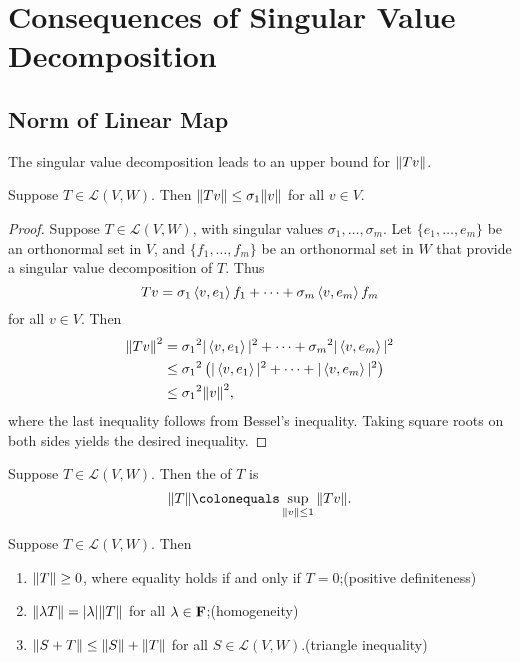 \section{Consequences of Singular Value Decomposition}
\subsection{Norm of Linear Map}
The singular value decomposition leads to an upper bound for $\norm{Tv}$.

\begin{lemma}\label{lemma:norm-upper-bound}
Suppose $T\in\mathcal{L}(V,W)$. Then $\norm{Tv}\le\sigma_1\norm{v}$ for all $v\in V$.
\end{lemma}

\begin{proof}
Suppose $T\in\mathcal{L}(V,W)$, with singular values $\sigma_1,\dots,\sigma_m$. 
Let $\{e_1,\dots,e_m\}$ be an orthonormal set in $V$, and $\{f_1,\dots,f_m\}$ be an orthonormal set in $W$ that provide a singular value decomposition of $T$. 
Thus
\[Tv=\sigma_1\left\langle v,e_1\right\rangle f_1+\cdots+\sigma_m\left\langle v,e_m\right\rangle f_m\]
for all $v\in V$. Then
\begin{align*}
\norm{Tv}^2&={\sigma_1}^2|\left\langle v,e_1\right\rangle|^2+\cdots+{\sigma_m}^2|\left\langle v,e_m\right\rangle|^2\\
&\le{\sigma_1}^2\left(|\left\langle v,e_1\right\rangle|^2+\cdots+|\left\langle v,e_m\right\rangle|^2\right)\\
&\le{\sigma_1}^2\norm{v}^2,
\end{align*}
where the last inequality follows from Bessel's inequality. 
Taking square roots on both sides yields the desired inequality.
\end{proof}

\begin{definition}
Suppose $T\in\mathcal{L}(V,W)$. Then the  of $T$ is
\[\norm{T}\colonequals\sup_{\norm{v}\le 1}\norm{Tv}.\]
\end{definition}

\begin{lemma}
Suppose $T\in\mathcal{L}(V,W)$. Then
\begin{enumerate}[label=(\roman*)]
\item $\norm{T}\ge0$, where equality holds if and only if $T=0$;\hfill(positive definiteness)
\item $\norm{\lambda T}=|\lambda|\norm{T}$ for all $\lambda\in\mathbf F$;\hfill(homogeneity)
\item $\norm{S+T}\le\norm{S}+\norm{T}$ for all $S\in\mathcal{L}(V,W)$.\hfill(triangle inequality)
\end{enumerate}
\end{lemma}

